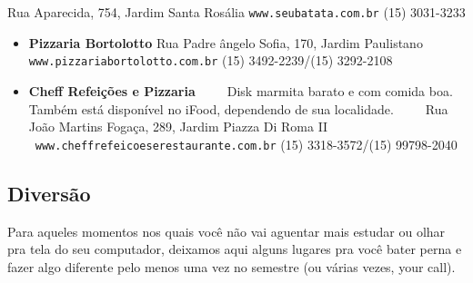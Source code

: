 \begin{multicols}{2}
\begin{itemize}
      \newline Rua Aparecida, 754, Jardim Santa Rosália
      \newline \texttt{www.seubatata.com.br}
      \newline (15) 3031-3233
  \end{itemize}
  \begin{itemize}
    \item \textbf{Pizzaria Bortolotto}
      \newline Rua Padre ângelo Sofia, 170, Jardim Paulistano
      \newline \texttt{www.pizzariabortolotto.com.br}
      \newline (15) 3492-2239/(15) 3292-2108
  \end{itemize}
  \begin{itemize}
    \item \textbf{Cheff Refeições e Pizzaria}
      \newline Disk marmita barato e com comida boa. Também está disponível no iFood, dependendo de sua localidade.
      \newline Rua João Martins Fogaça, 289, Jardim Piazza Di Roma II
      \newline \texttt{www.cheffrefeicoeserestaurante.com.br}
      \newline (15) 3318-3572/(15) 99798-2040
  \end{itemize}
\end{multicols}

\subsection{Diversão}
Para aqueles momentos nos quais você não vai aguentar mais estudar ou olhar pra tela do seu computador, deixamos aqui alguns lugares pra você bater perna e fazer algo diferente pelo menos uma vez no semestre (ou várias vezes, your call).

